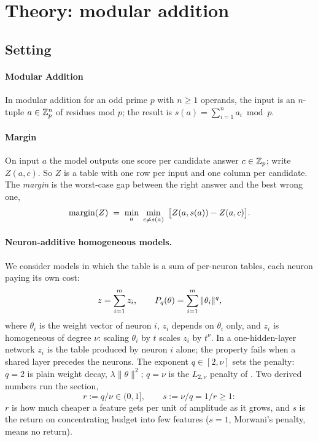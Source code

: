 \section{Theory: modular addition}
\subsection{Setting}
\label{sec:setting}

\paragraph{Modular Addition} In modular addition for an odd prime $p$ with $n\ge 1$ operands, the input is an
$n$-tuple $a\in\mathbb{Z}_p^n$ of residues mod $p$; the result is $s(a)=\sum_{i=1}^n a_i \bmod p$.


\paragraph{Margin} On input $a$ the model outputs one score per candidate answer
$c\in\mathbb{Z}_p$; write $Z(a,c)$. So $Z$ is a table with one row per input and one column per candidate.
The \emph{margin} is the worst-case gap between the right answer and the best wrong one,
\begin{equation}
  \marg(Z) \;=\; \min_{a}\ \min_{c\neq s(a)}\ \big[Z(a,s(a)) - Z(a,c)\big].
\end{equation}

\paragraph{Neuron-additive homogeneous models.} We consider models in which the table is a sum of
per-neuron tables, each neuron paying its own cost:
\begin{equation}
  z=\sum_{i=1}^m z_i,\qquad P_q(\theta)=\sum_{i=1}^m \|\theta_i\|^q ,
\end{equation}
where $\theta_i$ is the weight vector of neuron $i$, $z_i$ depends on $\theta_i$ only, and
$z_i$ is homogeneous of degree $\nu$: scaling $\theta_i$ by $t$ scales $z_i$ by $t^\nu$. In a
one-hidden-layer network $z_i$ is the table produced by neuron $i$ alone; the property fails when a
shared layer precedes the neurons. The exponent $q\in[2,\nu]$ sets the penalty: $q=2$ is plain
weight decay, $\lambda\|\theta\|^2$; $q=\nu$ is the $L_{2,\nu}$ penalty of \citet{morwani2024feature}.
Two derived numbers run the section,
\begin{equation}
  r:=q/\nu\in(0,1],\qquad s:=\nu/q=1/r\ge 1 :
\end{equation}
$r$ is how much cheaper a feature gets per unit of amplitude as it grows, and $s$ is the return on
concentrating budget into few features ($s=1$, Morwani's penalty, means no return).


